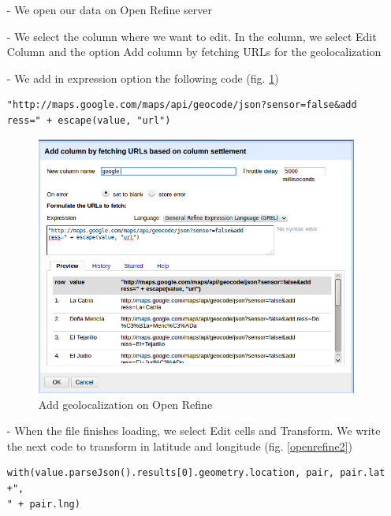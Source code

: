 \documentclass[10pt,a4paper]{article}
\begin{document}
\begin{itemize}
\item[-] We open our data on Open Refine server
\item[-] We select the column where we want to edit. In the column, we select Edit Column and the option Add column by fetching URLs for the geolocalization
\item[-]We add in expression option the following code (fig. \ref{openrefine1}) 
\begin{verbatim}
"http://maps.google.com/maps/api/geocode/json?sensor=false&add
ress=" + escape(value, "url")
\end{verbatim}

\begin{figure}[htp]
\centering
\includegraphics[scale=0.30]{openrefine1.png}
\caption{Add geolocalization on Open Refine}
\label{openrefine1}
\end{figure}

\item[-] When the file finishes loading, we select Edit cells and Transform. We write the next code to transform in latitude and longitude (fig. \ref{openrefine2})
\begin{verbatim}
with(value.parseJson().results[0].geometry.location, pair, pair.lat +",
" + pair.lng)
\end{verbatim}


\end{itemize}
\end{document}
